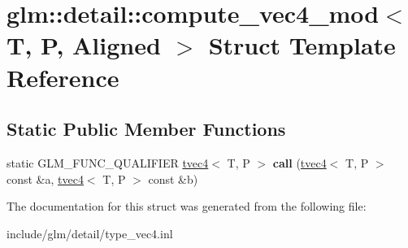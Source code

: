 \hypertarget{structglm_1_1detail_1_1compute__vec4__mod}{}\section{glm\+:\+:detail\+:\+:compute\+\_\+vec4\+\_\+mod$<$ T, P, Aligned $>$ Struct Template Reference}
\label{structglm_1_1detail_1_1compute__vec4__mod}
\subsection*{Static Public Member Functions}
\begin{DoxyCompactItemize}
\item 
\mbox{\label{structglm_1_1detail_1_1compute__vec4__mod_afb3c4f4634785c81bcafbee28cc56451}} 
static G\+L\+M\+\_\+\+F\+U\+N\+C\+\_\+\+Q\+U\+A\+L\+I\+F\+I\+ER \hyperlink{structglm_1_1tvec4}{tvec4}$<$ T, P $>$ {\bfseries call} (\hyperlink{structglm_1_1tvec4}{tvec4}$<$ T, P $>$ const \&a, \hyperlink{structglm_1_1tvec4}{tvec4}$<$ T, P $>$ const \&b)
\end{DoxyCompactItemize}


The documentation for this struct was generated from the following file\+:\begin{DoxyCompactItemize}
\item 
include/glm/detail/type\+\_\+vec4.\+inl\end{DoxyCompactItemize}
